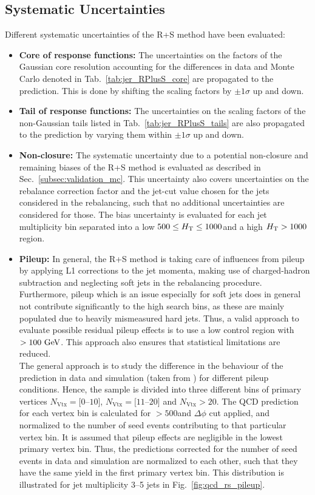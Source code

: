 \subsection{Systematic Uncertainties}
\label{subsec:RA2_syst_unc}
Different systematic uncertainties of the R+S method have been evaluated:
\begin{itemize}
\item \textbf{Core of response functions:} The uncertainties on the factors of the Gaussian core resolution accounting for the differences in data and Monte Carlo denoted in Tab.~\ref{tab:jer_RPlusS_core} are propagated to the prediction. This is done by shifting the scaling factors by $\pm 1\sigma$ up and down. 
\item \textbf{Tail of response functions:} The uncertainties on the scaling factors of the non-Gaussian tails listed in Tab.~\ref{tab:jer_RPlusS_tails} are also propagated to the prediction by varying them within $\pm 1\sigma$ up and down. 
\item \textbf{Non-closure:} The systematic uncertainty due to a potential non-closure and remaining biases of the R+S method is evaluated as described in Sec.~\ref{subsec:validation_mc}. This uncertainty also covers uncertainties on the rebalance correction factor and the jet-\pt cut value chosen for the jets considered in the rebalancing, such that no additional uncertainties are considered for those. The bias uncertainty is evaluated for each jet multiplicity bin separated into a low $ 500 \leq H_{\text{T}} \leq 1000$\gev and a high $H_{\text{T}} > 1000$\gev region.
\item \textbf{Pileup:} In general, the R+S method is taking care of influences from pileup by applying L1 corrections to the jet momenta, making use of charged-hadron subtraction and neglecting soft jets in the rebalancing procedure. Furthermore, pileup which is an issue especially for soft jets does in general not contribute significantly to the high \MHT search bins, as these are mainly populated due to heavily mismeasured hard jets. Thus, a valid approach to evaluate possible residual pileup effects is to use a low \MHT control region with \MHT $> 100 \rm{~GeV}$. This approach also ensures that statistical limitations are reduced.\\
The general approach is to study the difference in the behaviour of the prediction in data and simulation (taken from \madgraph) for different pileup conditions. Hence, the sample is divided into three different bins of primary vertices $N_\mathrm{Vtx} = [0$--$10]$, $N_\mathrm{Vtx} = [11$--$20]$ and $N_\mathrm{Vtx} > 20$. The QCD prediction for each vertex bin is calculated for \HT $>500$\gev and $\Delta \phi$ cut applied, and normalized to the number of seed events contributing to that particular vertex bin. It is assumed that pileup effects are negligible in the lowest primary vertex bin. Thus, the predictions corrected for the number of seed events in data and simulation are normalized to each other, such that they have the same yield in the first primary vertex bin. This distribution is illustrated for jet multiplicity 3--5 jets in Fig.~\ref{fig:qcd_rs_pileup}. 
\end{itemize}
